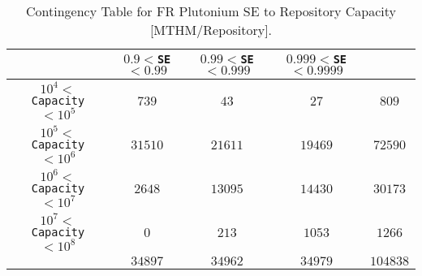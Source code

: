 \begin{table}
\caption{Contingency Table for FR Plutonium SE to Repository Capacity [MTHM/Repository].}
\begin{center}
\footnotesize
\begin{tabular}{|c||c|c|c||c|}
\hline
&$0.9<$\texttt{SE}$<0.99$&$0.99<$\texttt{SE}$<0.999$&$0.999<$\texttt{SE}$<0.9999$&\\
\hline
$10^4 <$ \texttt{Capacity} $< 10^5$&$739$&$43$&$27$&$809$\\
\hline
$10^5 <$ \texttt{Capacity} $< 10^6$&$31510$&$21611$&$19469$&$72590$\\
\hline
$10^6 <$ \texttt{Capacity} $< 10^7$&$2648$&$13095$&$14430$&$30173$\\
\hline
$10^7 <$ \texttt{Capacity} $< 10^8$&$0$&$213$&$1053$&$1266$\\
\hline
&$34897$&$34962$&$34979$&$104838$\\
\hline
\end{tabular}
\end{center}
\label{ct2d_example}
\end{table}
